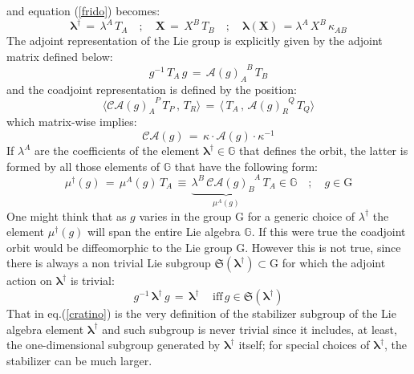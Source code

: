 \documentclass[10pt,a4paper]{article}
\begin{document}
and equation (\ref{frido}) becomes:
\begin{equation}\label{corteorzo}
  \boldsymbol{\lambda}^\dagger \, = \, \lambda^A \, T_A \quad ; \quad \mathbf{X} \, =\, X^B\, T_B  \quad ; \quad
  \boldsymbol{\lambda}(\mathbf{X}) \, = \lambda^A \, X^B \, \kappa_{AB}
\end{equation}
The adjoint representation of the Lie group is explicitly given by the adjoint matrix defined below:
\begin{equation}\label{coccode}
  g^{-1}\,  T_A \, g \, = \,\mathcal{ A}(g)_{A}^{\phantom{A}B} \, T_B
\end{equation}
and the coadjoint representation is defined by the position:
\begin{equation}\label{fischiacurvo}
  \langle \mathcal{CA}(g)_{A}^{\phantom{A}P} \,T_P \, , \, T_R \rangle \, = \, \langle
  \,T_A \, , \, \mathcal{A}(g)_{R}^{\phantom{R}Q}\, T_Q \rangle
\end{equation}
which matrix-wise implies:
\begin{equation}\label{frescobaldo}
  \mathcal{CA}(g) \, = \, \kappa\cdot \mathcal{A}(g) \cdot \kappa^{-1}
\end{equation}
If $\lambda^A$ are the coefficients of the element $\boldsymbol{\lambda}^\dagger \in \mathbb{G}$ that defines the orbit, the latter is formed by all those elements of $\mathbb{G}$ that have the following form:
\begin{equation}\label{crugone}
  \mu^\dagger(g) \, = \, \mu^A(g) \, T_A \, \equiv \,\underbrace{\lambda^B \,\mathcal{CA}(g)_B^{\phantom{B} A}}_{\mu^A(g)} \, T_A \in \mathbb{G} \quad ; \quad g\in \mathrm{G}
\end{equation}
One might think that as $g$ varies in the group $\mathrm{G}$ for a generic choice of $\lambda^\dagger$  the element $\mu^\dagger(g)$ will span the entire Lie algebra $\mathbb{G}$. If this were true the coadjoint orbit would be diffeomorphic to the  Lie group $\mathrm{G}$. However this is not true, since there is always a non trivial Lie subgroup $\mathfrak{S}(\boldsymbol{\lambda}^\dagger) \subset \mathrm{G}$ for which the adjoint action on $\boldsymbol{\lambda}^\dagger$ is trivial:
\begin{equation}\label{cratino}
 g^{-1} \, \boldsymbol{\lambda}^\dagger \, g \, = \, \boldsymbol{\lambda}^\dagger \quad \, \text{iff}  \, g\in\mathfrak{S}(\boldsymbol{\lambda}^\dagger)
 \end{equation}
That in eq.(\ref{cratino}) is the very definition of the stabilizer subgroup of the Lie algebra element $\boldsymbol{\lambda}^\dagger$ and such subgroup is never trivial since  it includes, at least, the one-dimensional subgroup generated by $\boldsymbol{\lambda}^\dagger$ itself;  for special choices of $\boldsymbol{\lambda}^\dagger$, the stabilizer can be much larger.
\end{document}
